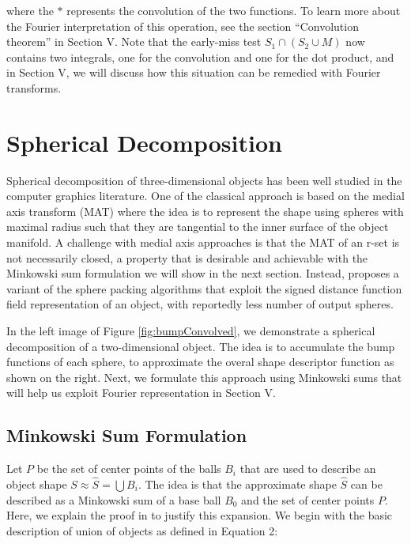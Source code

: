 \documentclass[letterpaper, 10 pt, conference]{ieeeconf}
\begin{document}
\noindent where the $\ast$ represents the convolution of the two functions. To learn more about the 
Fourier interpretation of this operation, see the section ``Convolution theorem'' in Section V.
Note that the early-miss test $S_1 \cap (S_2 \cup M)$ now contains two integrals, one for
the convolution and one for the dot product, and in Section V, we will discuss how this situation
can be remedied with Fourier transforms.

\section{Spherical Decomposition}

Spherical decomposition of three-dimensional objects has been well studied in the computer graphics
literature. One of the classical approach is based on the medial axis transform (MAT) where the idea
is to represent the shape using spheres with maximal radius such that they are tangential to the
inner surface of the object manifold. A challenge with medial axis approaches is that the MAT of 
an r-set is not necessarily closed, a property that is desirable and achievable with the Minkowski
sum formulation we will show in the next section. Instead, \cite{behandish2016analytic} proposes
a variant of the sphere packing algorithms that exploit the signed distance function field representation
of an object, with reportedly less number of output spheres.

In the left image of Figure \ref{fig:bumpConvolved}, we demonstrate a spherical decomposition of a
two-dimensional object. The idea is to accumulate the bump functions of each sphere, to approximate
the overal shape descriptor function as shown on the right. Next, we formulate this approach using
Minkowski sums that will help us exploit Fourier representation in Section V.

\subsection{Minkowski Sum Formulation}

Let $P$ be the set of center points of the balls $B_i$ that are used to describe an object shape
$S \approx \hat{S} = \bigcup B_i$. The idea is that the approximate shape $\hat{S}$ can be described
as a Minkowski sum of a base ball $B_0$ and the set of center points $P$. Here, we explain 
the proof in \cite{behandish2016analytic} to justify this expansion. We begin with the 
basic description of union of objects as defined in Equation 2:
\end{document}
